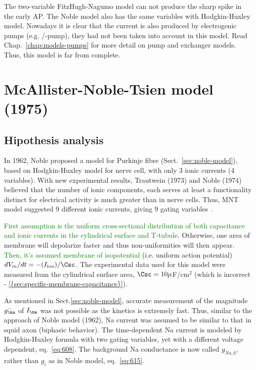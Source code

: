 The two-variable FitzHugh-Nagumo model can not produce the sharp spike
in the early AP.  The Noble model also has the same variables with
Hodgkin-Huxley model.  Nowadays it is clear that the current is also
produced by electrogenic pumps (e.g. /-pump), they had
not been taken into account in this model. Read
Chap.~\ref{chap:models-pumps} for more detail on pump and exchanger
models. Thus, this model is far from
complete. %


\section{McAllister-Noble-Tsien model (1975)}
\label{sec:macall-noble-tsien}


\subsection{Hipothesis analysis}
\label{sec:hipothesis-analysis}

In 1962, Noble proposed a model for Purkinje fibre
(Sect.~\ref{sec:noble-model}), based on Hodgkin-Huxley model for nerve cell,
with only 3 ionic currents (4 variables). With new experimental results,
Trautwein (1973) and Noble (1974) believed that the number of ionic components,
each serves at least a functionality  distinct for electrical activity is much
greater than in nerve cells.  Thus, MNT model suggested 9 different ionic
currents, giving 9 gating variables~\citep{mcallister1975rea}.

\textcolor{green}{First assumption is the uniform cross-sectional
  distribution of both capacitance and ionic currents in the cylindrical surface
  and T-tubule}.
Otherwise, one area of membrane will depolarize faster and thus non-uniformities
will then appear. \textcolor{green}{Then, it's assumed membrane of isopotential}
(i.e. uniform action potential) $dV_m/dt=-(I_\ion)/\Csc$. The experimental data
used for this model were measured from the cylindrical surface area,
$\Csc=10\mu$F/cm$^2$ (which is incorrect -
\ref{{sec:specific-membrane-capacitance}}).

As mentioned in Sect.\ref{sec:noble-model}, accurate measurement of the
magnitude $\bar{g_\na}$ of $I_\na$ was not possible as the kinetics is extremely
fast. Thus, similar to the approach of Noble model (1962), Na current was
assumed to be similar to that in squid axon (biphasic behavior). The
time-dependent Na current is modeled by Hodgkin-Huxley formula with two gating
variables, yet with a different voltage dependent, eq.~\eqref{eq:608}. The
background Na conductance is now called $g_{Na,b}$, rather than $g_i$ as in
Noble model, eq.~\eqref{eq:615}.

